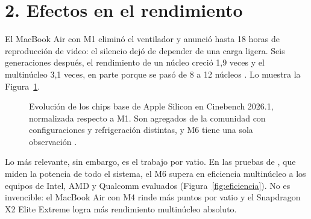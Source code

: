 \documentclass[11pt,letterpaper]{article}
\begin{document}
\section*{2. Efectos en el rendimiento}

El MacBook Air con M1 eliminó el ventilador y anunció hasta 18 horas de
reproducción de video: el silencio dejó de depender de una carga ligera. Seis
generaciones después, el rendimiento de un núcleo creció 1,9 veces y el
multinúcleo 3,1 veces, en parte porque se pasó de 8 a 12 núcleos
\parencite{timm2026}. Lo muestra la Figura~\ref{fig:evolucion}.

\begin{figure}[H]
\centering
{}
\caption{Evolución de los chips base de Apple Silicon en Cinebench 2026.1,
normalizada respecto a M1. Son agregados de la comunidad con configuraciones y
refrigeración distintas, y M6 tiene una sola observación \parencite{timm2026}.}
\label{fig:evolucion}
\end{figure}

Lo más relevante, sin embargo, es el trabajo por vatio. En las pruebas de
\textcite{notebookcheck2026}, que miden la potencia de todo el sistema, el M6
supera en eficiencia multinúcleo a los equipos de Intel, AMD y Qualcomm
evaluados (Figura~\ref{fig:eficiencia}). No es invencible: el MacBook Air
con M4 rinde más puntos por vatio y el Snapdragon X2 Elite Extreme logra más
rendimiento multinúcleo absoluto.
\end{document}
